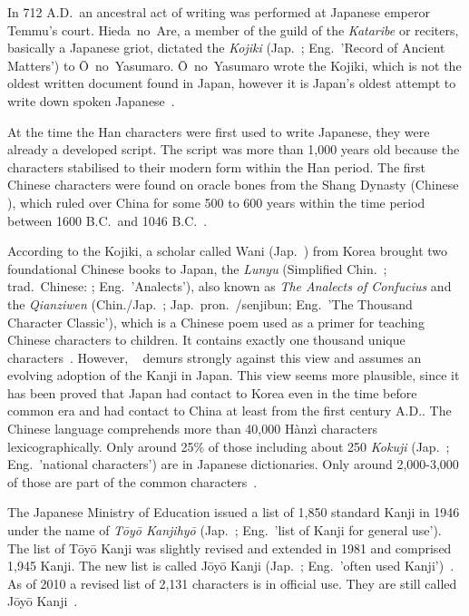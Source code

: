 In 712 A.D.\ an ancestral act of writing was performed at 
Japanese emperor Temmu's court. Hieda~no~Are, a member of the guild of the 
\emph{Kataribe} or reciters, basically a Japanese griot, dictated the 
\emph{Kojiki} (Jap.\ ; Eng.\ 'Record of Ancient Matters') to 
Ō~no~Yasumaro. Ō~no~Yasumaro wrote the Kojiki, which is not the oldest written 
document found in Japan, however it is Japan's oldest attempt to write down 
spoken Japanese~.

At the time the Han characters were first used to write Japanese, 
they were already a developed script. The script was more than 1,000 years old
because the characters stabilised to their modern form within the Han 
period. %
The first Chinese characters were found on oracle bones from the Shang Dynasty
(Chinese ), which ruled over China for some 500 to 600 years within 
the time period between 1600 B.C.\ and 1046 
B.C.~.

According to the Kojiki, a scholar called Wani (Jap.\ ) from Korea 
brought two foundational Chinese books to Japan, the \emph{Lunyu} 
(Simplified Chin.\ ; trad.\ Chinese: ; Eng.\ 'Analects'), 
also known as \emph{The Analects of Confucius} and 
the \emph{Qianziwen} (Chin./Jap.\ ; Jap.\ 
pron.\ /senjibun; Eng.\ 'The Thousand Character Classic'),
which is a Chinese poem used as a primer for teaching Chinese characters to 
children. It contains exactly one thousand unique 
characters~. However, 
~\citeyear{Lange1922} demurs strongly against this view 
and assumes an evolving adoption of the Kanji in
Japan. This view seems more plausible, since it has been proved that Japan 
had contact to Korea even in the time before common era and had contact to 
China at least from the first century A.D.. The Chinese language comprehends more
than 40,000 Hànzì characters lexicographically. Only around 25\% of those 
including about 250 \emph{Kokuji} (Jap.\ \cjk{国字}; Eng.\ 'national characters') 
are in Japanese dictionaries. Only around 2,000-3,000 of those are part of the 
common characters~\shortcite{Foljanty1984}. 

The Japanese Ministry of Education issued a list of 1,850 standard Kanji in 1946
under the name of \emph{Tōyō Kanjihyō} (Jap.\ \cjk{当用漢字表};
Eng.\ 'list of Kanji for general use'). The list of Tōyō Kanji was slightly 
revised and extended in 1981 and comprised 1,945 Kanji. The new list is 
called Jōyō Kanji
(Jap.\ ; Eng.\ 'often used Kanji')~.
As of 2010 a revised list of 2,131 characters is in official 
use. They are still called Jōyō Kanji~. 

